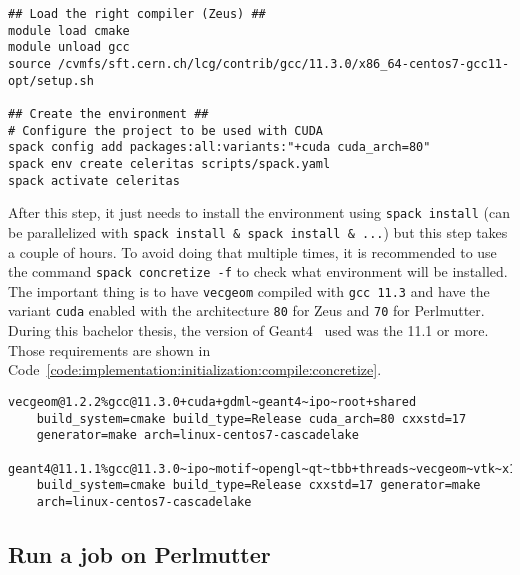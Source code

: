 \begin{code}
    \label{code:implementation:initialization:compile:pre-steps}
    \begin{verbatim}
## Load the right compiler (Zeus) ##
module load cmake
module unload gcc
source /cvmfs/sft.cern.ch/lcg/contrib/gcc/11.3.0/x86_64-centos7-gcc11-opt/setup.sh

## Create the environment ##
# Configure the project to be used with CUDA
spack config add packages:all:variants:"+cuda cuda_arch=80"
spack env create celeritas scripts/spack.yaml
spack activate celeritas
    \end{verbatim}
\end{code}

After this step, it just needs to install the environment using
\texttt{spack install} (can be parallelized with \texttt{spack install \& spack install \& ...})
but this step takes a couple of hours.
To avoid doing that multiple times, it is recommended to use the command
\texttt{spack concretize -f} to check what environment will be installed.
The important thing is to have \texttt{vecgeom} compiled with \texttt{gcc 11.3}
and have the variant \texttt{cuda} enabled with the architecture \texttt{80} for
Zeus and \texttt{70} for Perlmutter.
During this bachelor thesis, the version of Geant4~\cite{geant4} used was the
11.1 or more.
Those requirements are shown in Code~\ref{code:implementation:initialization:compile:concretize}.

\begin{code}
    \label{code:implementation:initialization:compile:concretize}
    \begin{verbatim}
vecgeom@1.2.2%gcc@11.3.0+cuda+gdml~geant4~ipo~root+shared
    build_system=cmake build_type=Release cuda_arch=80 cxxstd=17
    generator=make arch=linux-centos7-cascadelake

geant4@11.1.1%gcc@11.3.0~ipo~motif~opengl~qt~tbb+threads~vecgeom~vtk~x11
    build_system=cmake build_type=Release cxxstd=17 generator=make
    arch=linux-centos7-cascadelake
    \end{verbatim}
\end{code}


\subsection{Run a job on Perlmutter}
\label{ch:implementation:initialization:perlmutter}

